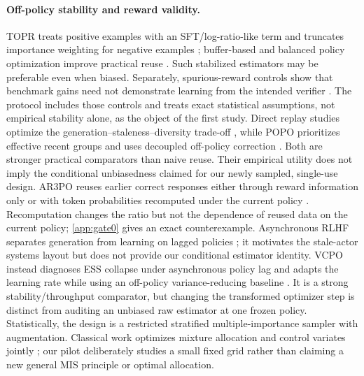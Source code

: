 \documentclass{article}
\begin{document}
\paragraph{Off-policy stability and reward validity.}
TOPR treats positive examples with an SFT/log-ratio-like term and truncates
importance weighting for negative examples \cite{leroux2025topr};
buffer-based and balanced policy optimization improve
practical reuse \cite{wan2026buffer,xi2026bapo}. Such stabilized estimators may
be preferable even when biased. Separately, spurious-reward controls show that
benchmark gains need not demonstrate learning from the intended verifier
\cite{shao2026spurious}. The protocol includes those controls and treats exact statistical
assumptions, not empirical stability alone, as the object of the first study.
Direct replay studies optimize the generation--staleness--diversity trade-off
\cite{arnal2026replay}, while POPO prioritizes effective recent groups and uses
decoupled off-policy correction \cite{mao2026popo}. Both are stronger practical
comparators than naive reuse. Their empirical utility does not imply the
conditional unbiasedness claimed for our newly sampled, single-use design.
AR3PO reuses earlier correct responses either through reward information only
or with token probabilities recomputed under the current policy
\cite{zhang2025ar3po}. Recomputation changes the ratio but not the dependence
of reused data on the current policy; \cref{app:gate0} gives an exact
counterexample.
Asynchronous RLHF separates generation from learning on lagged policies
\cite{noukhovitch2025async}; it motivates the stale-actor systems layout but
does not provide our conditional estimator identity. VCPO instead diagnoses
ESS collapse under asynchronous policy lag and adapts the learning rate while
using an off-policy variance-reducing baseline \cite{huang2026vcpo}. It is a
strong stability/throughput comparator, but changing the transformed optimizer
step is distinct from auditing an unbiased raw estimator at one frozen policy.
Statistically, the design is a restricted stratified multiple-importance
sampler with augmentation.
Classical work optimizes mixture allocation and control variates jointly
\cite{he2014optimal}; our pilot deliberately studies a small fixed grid rather
than claiming a new general MIS principle or optimal allocation.
\end{document}
